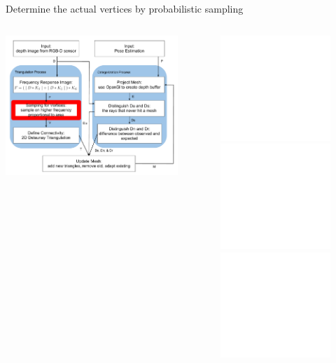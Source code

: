 \documentclass{beamer}
\begin{document}
\begin{frame}{Determine the actual vertices by probabilistic sampling}
\vspace{-.1in}
\begin{columns}
  \begin{center}
  \includegraphics[width=\textwidth]{SDsampling.pdf} 
  \end{center}
  \begin{center}
  \begin{figure}
  \includegraphics<1>[width=\textwidth]{m_fhist.pdf} 
  \includegraphics<2>[width=\textwidth]{m_ihist.pdf} 
  \includegraphics<3>[width=\textwidth]{m_csamples.pdf} 
  \end{figure}
  \end{center}
\end{columns}
\end{frame}
\end{document}
